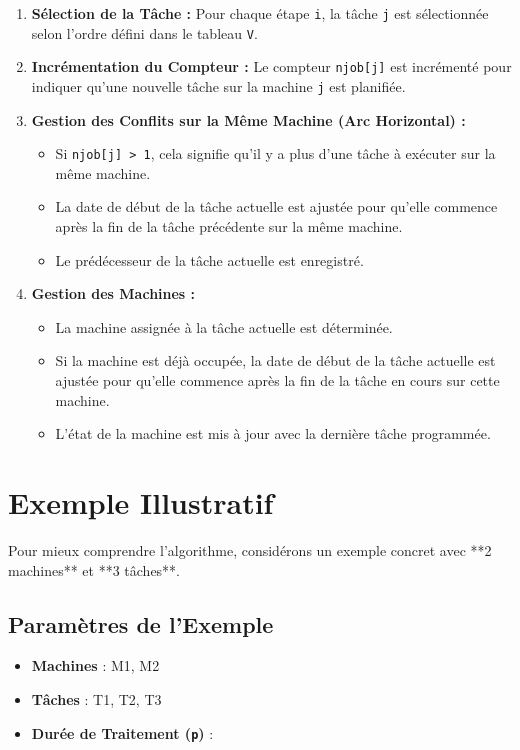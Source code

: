 \documentclass[12pt]{article}
\begin{document}
\begin{enumerate}
    \item \textbf{Sélection de la Tâche :} Pour chaque étape \texttt{i}, la tâche \texttt{j} est sélectionnée selon l'ordre défini dans le tableau \texttt{V}.
    \item \textbf{Incrémentation du Compteur :} Le compteur \texttt{njob[j]} est incrémenté pour indiquer qu'une nouvelle tâche sur la machine \texttt{j} est planifiée.
    \item \textbf{Gestion des Conflits sur la Même Machine (Arc Horizontal) :}
    \begin{itemize}
        \item Si \texttt{njob[j] > 1}, cela signifie qu'il y a plus d'une tâche à exécuter sur la même machine.
        \item La date de début de la tâche actuelle est ajustée pour qu'elle commence après la fin de la tâche précédente sur la même machine.
        \item Le prédécesseur de la tâche actuelle est enregistré.
    \end{itemize}
    \item \textbf{Gestion des Machines :}
    \begin{itemize}
        \item La machine assignée à la tâche actuelle est déterminée.
        \item Si la machine est déjà occupée, la date de début de la tâche actuelle est ajustée pour qu'elle commence après la fin de la tâche en cours sur cette machine.
        \item L'état de la machine est mis à jour avec la dernière tâche programmée.
    \end{itemize}
\end{enumerate}

\section{Exemple Illustratif}

Pour mieux comprendre l'algorithme, considérons un exemple concret avec **2 machines** et **3 tâches**.

\subsection{Paramètres de l'Exemple}

\begin{itemize}
    \item \textbf{Machines} : M1, M2
    \item \textbf{Tâches} : T1, T2, T3
    \item \textbf{Durée de Traitement (\texttt{p})} :
\end{itemize}
\end{document}
